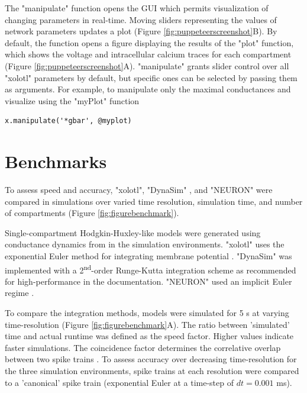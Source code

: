 \documentclass{frontiersSCNS} %
\begin{document}
The "manipulate" function opens the GUI which permits visualization of changing parameters in real-time. Moving sliders representing the values of network parameters updates a plot (Figure \ref{fig:puppeteerscreenshot}B). By default, the function opens a figure displaying the results of the "plot" function, which shows the voltage and intracellular calcium traces for each compartment (Figure \ref{fig:puppeteerscreenshot}A). "manipulate" grants slider control over all "xolotl" parameters by default, but specific ones can be selected by passing them as arguments. For example, to manipulate only the maximal conductances and visualize using the "myPlot" function


\begin{lstlisting}[style=Matlab-editor]
	x.manipulate('*gbar', @myplot)
\end{lstlisting}



%
%
%
%
%
%

\section{Benchmarks}
\label{benchmarks}

To assess speed and accuracy, "xolotl", "DynaSim" \autocite{sherfeyDynaSimMATLABToolbox2018}, and "NEURON" \autocite{hinesNEURONSimulationEnvironment1997} were compared in simulations over varied time resolution,  simulation time, and number of compartments (Figure \ref{fig:figurebenchmark}).

Single-compartment Hodgkin-Huxley-like models were generated using conductance dynamics from \cite{liuModelNeuronActivitydependent1998} in the simulation environments. "xolotl" uses the exponential Euler method for integrating membrane potential \autocite{dayanTheoreticalNeuroscience2001}. "DynaSim" was implemented with a 2\textsuperscript{nd}-order Runge-Kutta integration scheme as recommended for high-performance in the documentation. "NEURON" used an implicit Euler regime \autocite{hinesNEURONSimulationEnvironment1997}.

To compare the integration methods, models were simulated for 5 s at varying time-resolution (Figure \ref{fig:figurebenchmark}A). The ratio between 'simulated' time and actual runtime was defined as the speed factor. Higher values indicate faster simulations. The coincidence factor determines the correlative overlap between two spike trains \autocite{jolivetBenchmarkTestQuantitative2008}. To assess accuracy over decreasing time-resolution for the three simulation environments, spike trains at each resolution were compared to a 'canonical' spike train (exponential Euler at a time-step of $dt = 0.001$ ms). 
\end{document}
